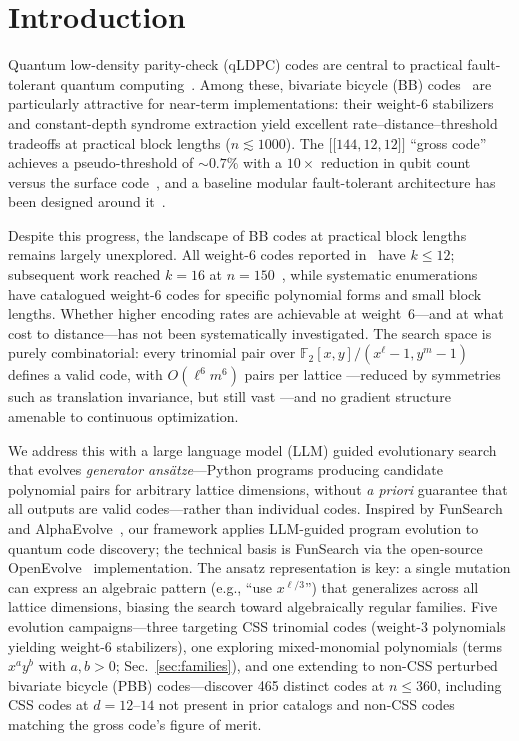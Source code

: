 \documentclass[aps,prxquantum,twocolumn,superscriptaddress,nofootinbib]{revtex4-2}
\newcommand{\FF}{\ensuremath{\mathbb{F}}}
\newcommand{\dblbrk}[1]{\ensuremath{\lbrack\!\lbrack #1 \rbrack\!\rbrack}}
\newcommand{\code}[1]{\dblbrk{#1}}
\begin{document}
\section{Introduction}
\label{sec:intro}

Quantum low-density parity-check (qLDPC) codes are central to practical fault-tolerant quantum computing~\cite{breuckmann2021quantum}.
Among these, bivariate bicycle (BB) codes~\cite{bravyi2024high} are particularly attractive for near-term implementations: their weight-6 stabilizers and constant-depth syndrome extraction yield excellent rate--distance--threshold tradeoffs at practical block lengths ($n \lesssim 1000$).
The $\code{144,12,12}$ ``gross code'' achieves a pseudo-threshold of ${\sim}0.7\%$ with a $10\times$ reduction in qubit count versus the surface code~\cite{bravyi2024high}, and a baseline modular fault-tolerant architecture has been designed around it~\cite{yoder2025tour}.

Despite this progress, the landscape of BB codes at practical block lengths remains largely unexplored.
All weight-6 codes reported in~\cite{bravyi2024high} have $k \leq 12$; subsequent work reached $k = 16$ at $n = 150$~\cite{wang2024coprime}, while systematic enumerations~\cite{liang2025generalized,lin2024abelian} have catalogued weight-6 codes for specific polynomial forms and small block lengths. 
Whether higher encoding rates are achievable at weight~6---and at what cost to distance---has not been systematically investigated.
The search space is purely combinatorial: every trinomial pair over $\FF_2[x,y]/(x^\ell{-}1, y^m{-}1)$ defines a valid code, with $O(\ell^6 m^6)$ pairs per lattice ---reduced by symmetries such as translation invariance, but still vast ---and no gradient structure amenable to continuous optimization.

We address this with a large language model (LLM) guided evolutionary search that evolves \emph{generator ansätze}---Python programs producing candidate polynomial pairs for arbitrary lattice dimensions, without \emph{a priori} guarantee that all outputs are valid codes---rather than individual codes.
Inspired by FunSearch~\cite{romera2024funsearch} and AlphaEvolve~\cite{novikov2025alphaevolve}, our framework applies LLM-guided program evolution to quantum code discovery; the technical basis is FunSearch via the open-source OpenEvolve~\cite{openevolve} implementation.
The ansatz representation is key: a single mutation can express an algebraic pattern (e.g., ``use $x^{\ell/3}$'') that generalizes across all lattice dimensions, biasing the search toward algebraically regular families. 
Five evolution campaigns---three targeting CSS trinomial codes (weight-3 polynomials yielding weight-6 stabilizers), one exploring mixed-monomial polynomials (terms $x^a y^b$ with $a,b > 0$; Sec.~\ref{sec:families}), and one extending to non-CSS perturbed bivariate bicycle (PBB) codes---discover 465 distinct codes at $n \leq 360$, including CSS codes at $d = 12$--$14$ not present in prior catalogs and non-CSS codes matching the gross code's figure of merit.
\end{document}
